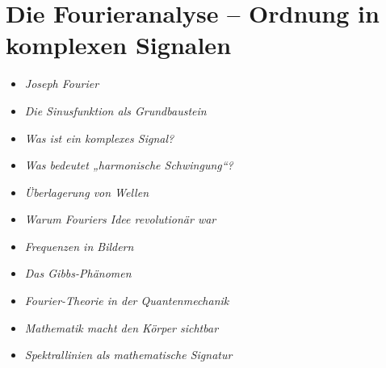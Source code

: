 \section{Die Fourieranalyse -- Ordnung in komplexen Signalen}

\begin{HistoryBox}
	\begin{itemize}
		\item \emph{Joseph Fourier}\dotfill \pageref{box:fourier-joseph-fourier}
	\end{itemize}
\end{HistoryBox}

\begin{MathBox}[Matheboxen]
	\begin{itemize}
		\item \emph{Die Sinusfunktion als Grundbaustein}\dotfill \pageref{box:fourier-sinus-grundbaustein}
	\end{itemize}
\end{MathBox}

\begin{DidacticBox}[Didaktikboxen]
	\begin{itemize}
		\item \emph{Was ist ein komplexes Signal?}\dotfill \pageref{box:fourier-komplexes-signal}
		\item \emph{Was bedeutet „harmonische Schwingung“?}\dotfill \pageref{box:fourier-harmonische-schwingung}
		\item \emph{Überlagerung von Wellen}\dotfill \pageref{box:fourier-ueberlagerung-wellen}
		\item \emph{Warum Fouriers Idee revolutionär war}\dotfill \pageref{box:fourier-revolutionaere-idee}
		\item \emph{Frequenzen in Bildern}\dotfill \pageref{box:fourier-frequenzen-in-bildern}
		\item \emph{Das Gibbs-Phänomen}\dotfill \pageref{box:fourier-gibbs-phaenomen}
		\item \emph{Fourier-Theorie in der Quantenmechanik}\dotfill \pageref{box:fourier-quantenmechanik}
	\end{itemize}
\end{DidacticBox}

\begin{PhysicsBox}[Physikboxen]
	\begin{itemize}
		\item \emph{Mathematik macht den Körper sichtbar}\dotfill \pageref{box:fourier-medizinische-bildgebung}
		\item \emph{Spektrallinien als mathematische Signatur}\dotfill \pageref{box:fourier-spektrallinien-signatur}
	\end{itemize}
\end{PhysicsBox}

